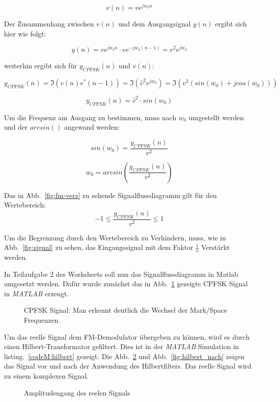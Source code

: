 \documentclass{article}
\begin{document}
$$
v(n) = v e^{j w_0 n}
$$

Der Zusammenhang zwischen $v(n)$ und dem Ausgangsignal $y(n)$ ergibt sich hier wie folgt:

$$
y(n) = v e^{j w_0 n} \cdot v e^{-j w_0 (n-1)} = v^2 e^{j w_0}
$$

weiterhin ergibt sich für $y_{CPFSK}(n)$ und $v(n)$:

$$
y_{CPFSK}(n) = \Im(v(n) v^\ast(n-1)) = \Im( \hat{v}^2 e^{j w_0}) = \Im(v^2 (sin(w_0) + j cos(w_0)))
$$

$$
y_{CPFSK}(n) = \hat{v}^2 \cdot sin(w_0)
$$

Um die Frequenz am Ausgang zu bestimmen, muss nach $w_0$ umgestellt werden und der $arcsin()$ angewand werden:

$$
sin(w_0) = \frac{y_{CPFSK}(n)}{v^2}
$$

$$
w_0 = arcsin(\frac{y_{CPFSK}(n)}{v^2})
$$

Das in Abb.~\ref{fig:fm-verz} zu sehende Signalflussdiagramm gilt für den Wertebereich:
$$
-1 \leq  \frac{y_{CPFSK}(n)}{v^2} \leq 1
$$

Um die Begrenzung durch den Wertebereich zu Verhindern, muss, wie in Abb.~\ref{fig:signal} zu sehen, 
das Eingangssignal mit dem Faktor $\frac{1}{v}$ Verstärkt werden.

In Teilaufgabe 2 des Worksheets soll nun das Signalflussdiagramm in Matlab umgesetzt werden.
Dafür wurde zunächst das in Abb.~\ref{fig:cpfsk} gezeigte CPFSK Signal in \textit{MATLAB} erzeugt.


\begin{figure}[!h]
    \centering
    \def\svgscale{0.5}
    \def\svgwidth{0.8\columnwidth}
    
    \caption{CPFSK Signal: Man erkennt deutlich die Wechsel der Mark/Space Frequenzen.}
    \label{fig:cpfsk}
\end{figure}

Um das reelle Signal dem FM-Demodulator übergeben zu können, wird es durch einen Hilbert-Transformator gefiltert.
Dies ist in der \textit{MATLAB} Simulation in listing.~\ref{codeM:hilbert} gezeigt. Die  Abb.~\ref{fig:hilbert_vor} und Abb.~\ref{fig:hilbert_nach} zeigen das Signal vor und nach 
der Anwendung des Hilbertfilters. Das reelle Signal wird zu einem komplexen Signal. 

\begin{figure}[!h]
    \centering
    \def\svgscale{0.5}
    \def\svgwidth{0.8\columnwidth}
    
    \caption{Amplitudengang des reelen Signals}
    \label{fig:hilbert_vor}
\end{figure}
\end{document}
